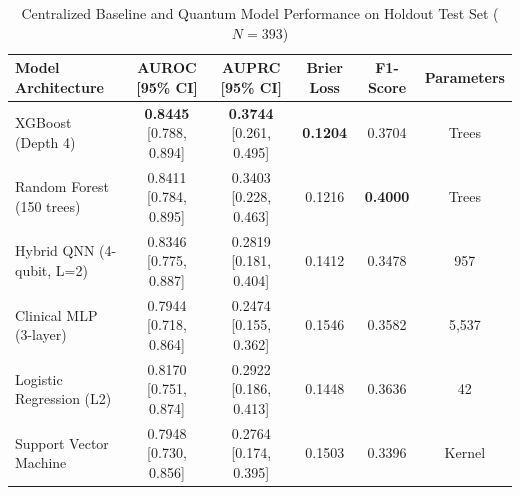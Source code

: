 \begin{table}[t]
\centering
\caption{Centralized Baseline and Quantum Model Performance on Holdout Test Set ($N=393$)}
\label{tab:centralized_comparison}
\begin{tabular}{lccccc}
\hline
\textbf{Model Architecture} & \textbf{AUROC [95\% CI]} & \textbf{AUPRC [95\% CI]} & \textbf{Brier Loss} & \textbf{F1-Score} & \textbf{Parameters} \\
\hline
XGBoost (Depth 4) & \textbf{0.8445} [0.788, 0.894] & \textbf{0.3744} [0.261, 0.495] & \textbf{0.1204} & 0.3704 & Trees \\
Random Forest (150 trees) & 0.8411 [0.784, 0.895] & 0.3403 [0.228, 0.463] & 0.1216 & \textbf{0.4000} & Trees \\
Hybrid QNN (4-qubit, L=2) & 0.8346 [0.775, 0.887] & 0.2819 [0.181, 0.404] & 0.1412 & 0.3478 & 957 \\
Clinical MLP (3-layer) & 0.7944 [0.718, 0.864] & 0.2474 [0.155, 0.362] & 0.1546 & 0.3582 & 5,537 \\
Logistic Regression (L2) & 0.8170 [0.751, 0.874] & 0.2922 [0.186, 0.413] & 0.1448 & 0.3636 & 42 \\
Support Vector Machine & 0.7948 [0.730, 0.856] & 0.2764 [0.174, 0.395] & 0.1503 & 0.3396 & Kernel \\
\hline
\end{tabular}
\end{table}
